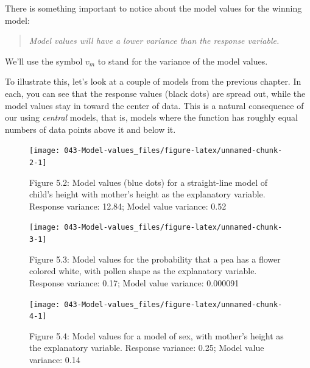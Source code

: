 \documentclass[]{tufte-book}
\begin{document}
There is something important to notice about the model values for the winning model:

\begin{quote}
\emph{Model values will have a lower variance than the response variable.}
\end{quote}

We'll use the symbol \(v_m\) to stand for the variance of the model values.

To illustrate this, let's look at a couple of models from the previous chapter. In each, you can see that the response values (black dots) are spread out, while the model values stay in toward the center of data. This is a natural consequence of our using \emph{central} models, that is, models where the function has roughly equal numbers of data points above it and below it.

\begin{figure}\texttt{[image: 043-Model-values\_files/figure-latex/unnamed-chunk-2-1]} \caption[Figure 5.2: Model values (blue dots) for a straight-line model of child's height with mother's height as the explanatory variable. Response variance: 12.84; Model value variance: 0.52]{Figure 5.2: Model values (blue dots) for a straight-line model of child's height with mother's height as the explanatory variable. Response variance: 12.84; Model value variance: 0.52}\label{fig:unnamed-chunk-2}
\end{figure}



\begin{figure}\texttt{[image: 043-Model-values\_files/figure-latex/unnamed-chunk-3-1]} \caption[Figure 5.3: Model values for the probability that a pea has a flower colored white, with pollen shape as the explanatory variable. Response variance: 0.17; Model value variance: 0.000091]{Figure 5.3: Model values for the probability that a pea has a flower colored white, with pollen shape as the explanatory variable. Response variance: 0.17; Model value variance: 0.000091}\label{fig:unnamed-chunk-3}
\end{figure}



\begin{figure}\texttt{[image: 043-Model-values\_files/figure-latex/unnamed-chunk-4-1]} \caption[Figure 5.4: Model values for a model of sex, with mother's height as the explanatory variable. Response variance: 0.25; Model value variance: 0.14]{Figure 5.4: Model values for a model of sex, with mother's height as the explanatory variable. Response variance: 0.25; Model value variance: 0.14}\label{fig:unnamed-chunk-4}
\end{figure}
\end{document}

